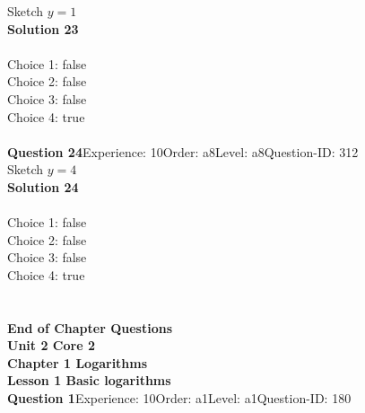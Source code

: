 \documentclass{article}
\begin{document}
Sketch $y=1$\\[4pt]
\noindent\textbf{Solution 23}\\[2pt]
\\[4pt]
Choice 1: \hspace{20pt} \hspace{20pt}false\\
Choice 2: \hspace{20pt} \hspace{20pt}false\\
Choice 3: \hspace{20pt} \hspace{20pt}false\\
Choice 4: \hspace{20pt} \hspace{20pt}true\\
\\[4pt]
\noindent\textbf{Question 24}\hspace{20pt}Experience: 10\hspace{20pt}Order: a8\hspace{20pt}Level: a8\hspace{20pt}Question-ID: 312\\[2pt]
Sketch $y=4$\\[4pt]
\noindent\textbf{Solution 24}\\[2pt]
\\[4pt]
Choice 1: \hspace{20pt} \hspace{20pt}false\\
Choice 2: \hspace{20pt} \hspace{20pt}false\\
Choice 3: \hspace{20pt} \hspace{20pt}false\\
Choice 4: \hspace{20pt} \hspace{20pt}true\\
\\[4pt]
\\[2pt]
\noindent\large{\textbf{End of Chapter Questions}}\\[15pt]
\noindent\huge{\textbf{Unit 2 Core 2}}\\[18pt]
\noindent\huge{\textbf{Chapter 1 Logarithms}}\\[15pt]
\noindent\huge{\textbf{Lesson 1 Basic logarithms}}\\[12pt]
\noindent\textbf{Question 1}\hspace{20pt}Experience: 10\hspace{20pt}Order: a1\hspace{20pt}Level: a1\hspace{20pt}Question-ID: 180\\[2pt]
\end{document}
